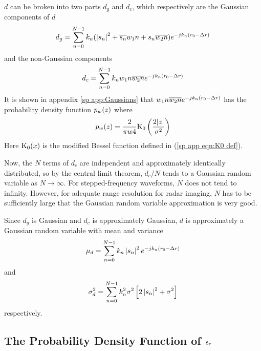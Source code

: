 $d$ can be broken into two parts $d_g$ and $d_c$, which respectively are the
Gaussian components of $d$
\begin{equation}
d_g=\sum_{n=0}^{N-1} k_n(\left|s_n\right|^2+\overline{s_n}{w_1}{n}+s_n\overline{{w_2}{n}})
{e^{-jk_n({r_0}-{\Delta r})}}
\end{equation}
and the non-Gaussian components
\begin{equation}
d_c=\sum_{n=0}^{N-1} k_n{w_1}{n}\overline{{w_2}{n}}{e^{-jk_n({r_0}-{\Delta r})}}
\end{equation}
It is shown in appendix \ref{sp app:Gaussians} that 
${w_1}{n}\overline{{w_2}{n}}{e^{-jk_n({r_0}-{\Delta r})}}$ has the probability density function 
$p_{{w}}(z)$ where
\begin{equation}
p_{{w}}(z)=\frac{2}{\pi{w}{4}}{\rm K_0}\left(
\frac{2|z|}{{\sigma^2}}\right)
\end{equation}
Here ${\rm K_0}(x)$ is the modified Bessel function defined in 
(\ref{sp app eqn:K0 def}).

Now, the $N$ terms of $d_c$ are independent and approximately identically
distributed, so by the central limit theorem, $d_c/N$ tends to a Gaussian
random variable as $N\rightarrow\infty$.  For stepped-frequency waveforms,
$N$ does not tend to infinity.  However, for adequate range resolution for
radar imaging, $N$ has to be sufficiently large that the Gaussian random
variable approximation is very good.

Since $d_g$ is Gaussian and $d_c$ is approximately Gaussian,
$d$ is approximately a Gaussian random variable with mean
and variance
\begin{equation}
\mu_d=\sum_{n=0}^{N-1} k_n\left|s_n\right|^2{e^{-jk_n({r_0}-{\Delta r})}}
\end{equation}
and 
\begin{equation}
\sigma_d^2=\sum_{n=0}^{N-1} k_n^2 {\sigma^2} \left[2\left|s_n\right|^2 +{\sigma^2}\right]
\end{equation}
respectively.

\subsection{The Probability Density Function of $\epsilon_r$}

